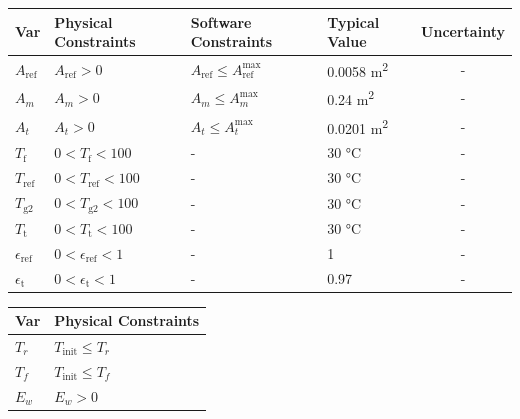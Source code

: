 \documentclass[12pt]{article}
\begin{document}
\begin{table}[!h]
  \caption{Input Variables} \label{TblInputVar}
  \renewcommand{\arraystretch}{1.2}
\noindent \begin{longtable*}{l l l l c} 
  \toprule
  \textbf{Var} & \textbf{Physical Constraints} & \textbf{Software Constraints} &
                             \textbf{Typical Value} & \textbf{Uncertainty}\\
  \midrule 

 $A_\text{ref}$ & $A_\text{ref} > 0$ & $A_\text{ref} \leq A_\text{ref}^\text{max}$ & 0.0058 \si[per-mode=symbol] {\square\metre}   & - 
  \\
  $A_m$ & $A_m > 0$ & $A_m \leq A_m^\text{max}$ & 0.24 \si[per-mode=symbol] {\square\metre}   & - 
  \\
  $A_t$ & $A_t > 0$ & $A_t \leq A_t^\text{max}$ & 0.0201 \si[per-mode=symbol] {\square\metre}   & - 
  \\
  $T_\text{f}$ & $0 < T_\text{f} < 100$ & - & 30 \si[per-mode=symbol] {\celsius} & - 
  \\
  $T_\text{ref}$ & $0 < T_\text{ref} < 100$ & - & 30 \si[per-mode=symbol] {\celsius} & - 
  \\
  $T_\text{g2}$ & $0 < T_\text{g2} < 100$ & - & 30 \si[per-mode=symbol] {\celsius} & - 
  \\
  $T_\text{t}$ & $0 < T_\text{t} < 100$ & - & 30 \si[per-mode=symbol] {\celsius} & - 
  \\
  $\epsilon_\text{ref}$ & $0 < \epsilon_\text{ref} < 1$ & - & 1 & -\\
   $\epsilon_\text{t}$ & $0 < \epsilon_\text{t} < 1$ & - & 0.97 & -\\
  
  \bottomrule
\end{longtable*}
\end{table}


\begin{table}[!h]
\caption{Output Variables} \label{TblOutputVar}
\renewcommand{\arraystretch}{1.2}
\noindent \begin{longtable*}{l l} 
  \toprule
  \textbf{Var} & \textbf{Physical Constraints} \\
  \midrule 
  $T_r$ & $T_\text{init} \leq T_r $ \\
  $T_f$ & $T_\text{init} \leq T_f $
  \\
  $E_w$ & $E_w > 0$ \\
  \bottomrule
\end{longtable*}
\end{table}
\end{document}
